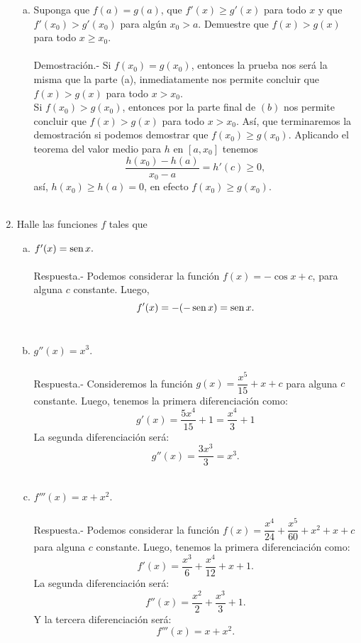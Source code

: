 \begin{enumerate}[\bfseries 1.]
\begin{enumerate}[(a)]
	    \item Suponga que $f(a)=g(a)$, que $f'(x)\geq g'(x)$ para todo $x$ y que $f'(x_0)>g'(x_0)$ para algún $x_0>a$. Demuestre que $f(x)>g(x)$ para todo $x\geq x_0$.\\\\
		Demostración.-\; Si $f(x_0)=g(x_0)$, entonces la prueba nos será la misma que la parte (a), inmediatamente nos permite concluir que $f(x)>g(x)$ para todo $x>x_0$.\\ 
		Si $f(x_0)>g(x_0)$, entonces por la parte final de $(b)$ nos permite concluir que $f(x)>g(x)$ para todo $x>x_0$. Así, que terminaremos la demostración si podemos demostrar que $f(x_0)\geq g(x_0)$. Aplicando el teorema del valor medio para $h$ en $[a,x_0]$ tenemos
		$$\dfrac{h(x_0)-h(a)}{x_0-a}=h'(c)\geq 0,$$
		así, $h(x_0)\geq h(a)=0$, en efecto $f(x_0)\geq g(x_0)$.\\\\

	\end{enumerate}

    \item Halle las funciones $f$ tales que
	\begin{enumerate}[(a)]

	    \item $f'(x)=\mathop{\mbox{\normalfont sen}}\nolimits x.$\\\\
		Respuesta.-\; Podemos considerar la función $f(x)=-\cos x + c$, para alguna $c$ constante. Luego,
		$$f'(x)=-(-\mathop{\mbox{\normalfont sen}}\nolimits x)=\mathop{\mbox{\normalfont sen}}\nolimits x.$$\\

	    \item $g''(x)=x^3$.\\\\
		Respuesta.-\; Consideremos la función $g(x)=\dfrac{x^5}{15}+x+c$ para alguna $c$ constante. Luego, tenemos la primera diferenciación como:
		$$g'(x)=\dfrac{5x^4}{15}+1=\dfrac{x^4}{3}+1$$
		La segunda diferenciación será:
		$$g''(x)=\dfrac{3x^3}{3}=x^3.$$\\

	    \item $f'''(x)=x+x^2$.\\\\
		Respuesta.-\; Podemos considerar la función $f(x)=\dfrac{x^4}{24}+\dfrac{x^5}{60}+x^2+x+c$ para alguna $c$ constante. Luego, tenemos la primera diferenciación como:
		$$f'(x)=\dfrac{x^3}{6}+\dfrac{x^4}{12}+x+1.$$
		La segunda diferenciación será:
		$$f''(x)=\dfrac{x^2}{2}+\dfrac{x^3}{3}+1.$$
		Y la tercera diferenciación será:
		$$f'''(x)=x+x^2.$$\\


\end{enumerate}
\end{enumerate}
